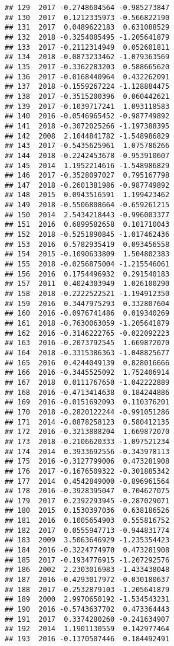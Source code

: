 \documentclass[
]{article}
\begin{document}
\begin{verbatim}
## 129  2017 -0.2748604564 -0.985273847
## 130  2017  0.1212335973 -0.566822190
## 131  2017  0.0489622183  0.631088529
## 132  2018 -0.3254085495 -1.205641879
## 133  2017 -0.2112314949  0.052601811
## 134  2018 -0.0873233462 -1.079363569
## 135  2017 -0.3362283203  0.588665620
## 136  2017 -0.0168440964  0.432262091
## 137  2018 -0.1559267224 -1.128884475
## 138  2017 -0.3515200396  0.060442621
## 139  2017 -0.1039717241  1.093118583
## 140  2016 -0.0546965452 -0.987749892
## 141  2018 -0.3072025266 -1.197388395
## 142  2008  2.1044841782 -1.548986829
## 143  2017 -0.5435625961  1.075786266
## 144  2018 -0.2242453678 -0.953910607
## 145  2014  1.1952214616 -1.548986829
## 146  2017 -0.3528097027  0.795167798
## 147  2018 -0.2601381986 -0.987749892
## 148  2015  0.0943516591  1.199423462
## 149  2018 -0.5506808664 -0.659261215
## 150  2014  2.5434218443 -0.996003377
## 151  2016  0.6899582658  0.101710043
## 152  2018 -0.5251890845 -1.017462436
## 153  2016  0.5782935419  0.093456558
## 154  2015 -0.1090633809  1.504802383
## 155  2018 -0.0256875004 -1.215546061
## 156  2016  0.1754496932  0.291540183
## 157  2011  0.4024303949  1.026100290
## 158  2018 -0.2222522521 -1.194912350
## 159  2016  0.3447975293  0.332807604
## 160  2016 -0.0976741486  0.019340269
## 161  2018 -0.7630063059 -1.205641879
## 162  2016 -0.3146222765 -0.022092223
## 163  2016 -0.2073792545  1.669872070
## 164  2018 -0.3315386363 -1.048825677
## 165  2016  0.4244049139  0.828016666
## 166  2016 -0.3445525092  1.752406914
## 167  2018  0.0111767650 -1.042222889
## 168  2016 -0.4713414638  0.184244886
## 169  2016 -0.0151692093  0.110376201
## 170  2018 -0.2820122244 -0.991051286
## 171  2014 -0.0878258123  0.580412135
## 172  2016 -0.3213888204  1.669872070
## 173  2018 -0.2106620333 -1.097521234
## 174  2014  0.3933692556 -0.343978113
## 175  2016 -0.3127799006  0.473281908
## 176  2017 -0.1676509322 -0.301885342
## 177  2014  0.4542849000 -0.896961564
## 178  2016 -0.3928395047  0.704627075
## 179  2017  0.2392293945 -0.287029071
## 180  2015  0.1530397036  0.638186526
## 181  2016  0.1005654903  0.555816752
## 182  2017  0.0555947713 -0.944831774
## 183  2009  3.5063646929 -1.235354423
## 184  2016 -0.3224774970  0.473281908
## 185  2017 -0.1934776915 -1.207292576
## 186  2002  2.2303016983 -1.433438048
## 187  2016 -0.4293017972 -0.030180637
## 188  2017 -0.2532879103 -1.205641879
## 189  2000  2.9970650192 -1.534543231
## 190  2016 -0.5743637702  0.473364443
## 191  2017  0.3374280260 -0.241634907
## 192  2014  1.1901130559  0.142977464
## 193  2016 -0.1370507446  0.184492491

\end{verbatim}
\end{document}
